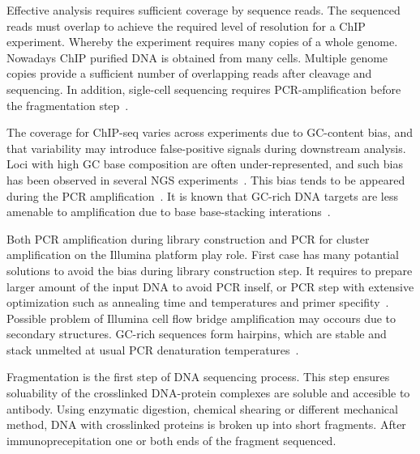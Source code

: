 Effective analysis requires sufficient coverage by sequence reads. 
The sequenced reads must overlap to achieve the required level of resolution for a ChIP experiment.
Whereby the experiment requires many copies of a whole genome.
Nowadays ChIP purified DNA is obtained from many cells.
Multiple genome copies provide a sufficient number of overlapping reads after cleavage and sequencing.
In addition, sigle-cell sequencing requires PCR-amplification before the fragmentation step~\cite{clark2016single}.

The coverage for ChIP-seq varies across experiments due to GC-content bias, and that variability may introduce false-positive signals during downstream analysis.
Loci with high GC base composition are often under-represented, and such bias has been observed in several NGS experiments~\cite{benjamini2012summarizing}\cite{dohm2008substantial}\cite{teng2017accounting}.
This bias tends to be appeared during the PCR amplification~\cite{ross2013characterizing}.
It is known that GC-rich DNA targets are less amenable to amplification due to base base-stacking interations~\cite{yakovchuk2006base}.


Both PCR amplification during library construction and PCR for cluster amplification on the Illumina platform play role. 
First case has many potantial solutions to avoid the bias during library construction step.
It requires to prepare larger amount of the input DNA to avoid PCR inself, or PCR step with extensive optimization such as annealing time and temperatures and primer specifity~\cite{aird2011analyzing}.
Possible problem of Illumina cell flow bridge amplification may occours due to secondary structures.
GC-rich sequences form hairpins, which are stable and stack unmelted at usual PCR denaturation temperatures~\cite{stein2010nucleosome}.



Fragmentation is the first step of DNA sequencing process.
This step ensures soluability of the crosslinked DNA-protein complexes are soluble and accesible to antibody.
Using enzymatic digestion, chemical shearing or different mechanical method, DNA with crosslinked proteins is broken up into short fragments.
After immunoprecepitation one or both ends of the fragment sequenced.

